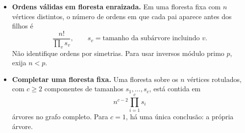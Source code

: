 \begin{itemize}[leftmargin=*,label={}]
\item \textbf{Ordens válidas em floresta enraizada.}
Em uma floresta fixa com $n$ vértices distintos, o número de ordens em que cada pai aparece antes dos filhos é
\[
\frac{n!}{\prod_v s_v},\qquad s_v=\text{tamanho da subárvore incluindo }v.
\]
Não identifique ordens por simetrias. Para usar inversos módulo primo $p$, exija $n<p$.

\item \textbf{Completar uma floresta fixa.}
Uma floresta sobre os $n$ vértices rotulados, com $c\ge2$ componentes de tamanhos $s_1,\ldots,s_c$, está contida em
\[
n^{c-2}\prod_{i=1}^{c}s_i
\]
árvores no grafo completo. Para $c=1$, há uma única conclusão: a própria árvore.
\end{itemize}



